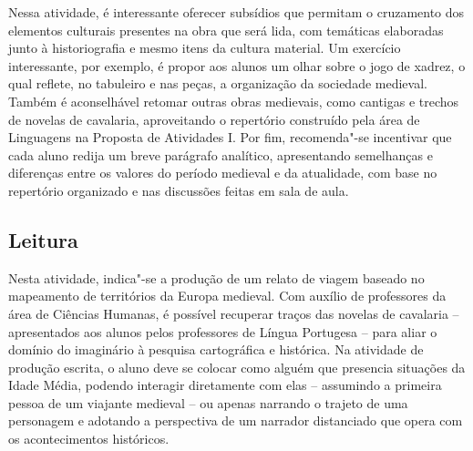 \documentclass[11pt]{extarticle}
\begin{document}
Nessa atividade, é interessante oferecer subsídios que permitam o
cruzamento dos elementos culturais presentes na obra que será lida, com
temáticas elaboradas junto à historiografia e mesmo itens da cultura
material. Um exercício interessante, por exemplo, é propor aos alunos um
olhar sobre o jogo de xadrez, o qual reflete, no tabuleiro e nas peças,
a organização da sociedade medieval. Também é aconselhável retomar
outras obras medievais, como cantigas e trechos de novelas de cavalaria,
aproveitando o repertório construído pela área de Linguagens na Proposta
de Atividades I. Por fim, recomenda"-se incentivar que cada aluno redija
um breve parágrafo analítico, apresentando semelhanças e diferenças
entre os valores do período medieval e da atualidade, com base no
repertório organizado e nas discussões feitas em sala de aula.


\subsection{Leitura}


Nesta atividade, indica"-se a produção de um relato de viagem
baseado no mapeamento de territórios da Europa medieval. Com auxílio de
professores da área de Ciências Humanas, é possível recuperar traços das
novelas de cavalaria -- apresentados aos alunos pelos professores de
Língua Portugesa -- para aliar o domínio do imaginário à pesquisa
cartográfica e histórica. Na atividade de produção escrita, o aluno deve
se colocar como alguém que presencia situações da Idade Média, podendo
interagir diretamente com elas -- assumindo a primeira pessoa de um
viajante medieval -- ou apenas narrando o trajeto de uma personagem e
adotando a perspectiva de um narrador distanciado que opera com os
acontecimentos históricos.
\end{document}
